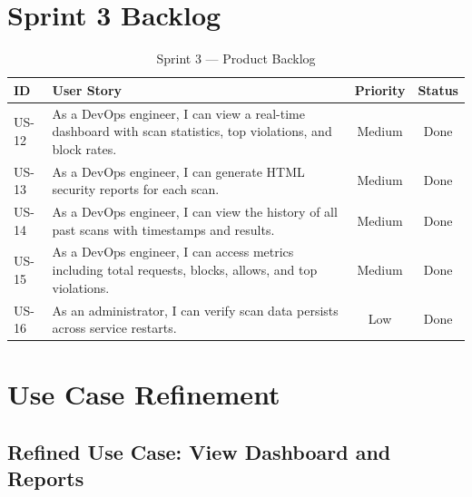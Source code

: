 \section{Sprint 3 Backlog}

\begin{table}[H]
\centering
\caption{Sprint 3 — Product Backlog}
\label{tab:sprint3-backlog}
\begin{tabular}{|p{0.8cm}|p{8.5cm}|c|c|}
\hline
\textbf{ID} & \textbf{User Story} & \textbf{Priority} & \textbf{Status} \\
\hline
US-12 & As a DevOps engineer, I can view a real-time dashboard with scan statistics, top violations, and block rates. & Medium & Done \\
\hline
US-13 & As a DevOps engineer, I can generate HTML security reports for each scan. & Medium & Done \\
\hline
US-14 & As a DevOps engineer, I can view the history of all past scans with timestamps and results. & Medium & Done \\
\hline
US-15 & As a DevOps engineer, I can access metrics including total requests, blocks, allows, and top violations. & Medium & Done \\
\hline
US-16 & As an administrator, I can verify scan data persists across service restarts. & Low & Done \\
\hline
\end{tabular}
\end{table}

\section{Use Case Refinement}

\subsection{Refined Use Case: View Dashboard and Reports}


